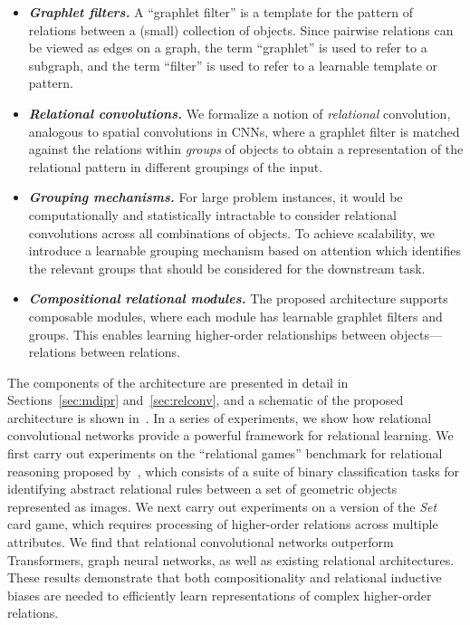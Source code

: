 \begin{itemize}%
    \item \textit{\bfseries Graphlet filters.} A ``graphlet filter'' is a template for the pattern of relations between a (small) collection of objects. 
    Since pairwise relations can be viewed as edges on a graph, the term ``graphlet'' is used to refer to a subgraph, and the term ``filter'' is used to refer to a learnable template or pattern.
    \item \textit{\bfseries Relational convolutions.} 
    We formalize a notion of \textit{relational} convolution, analogous to spatial convolutions in CNNs, where a graphlet filter is matched against the relations within \textit{groups} of objects to obtain a representation of the relational pattern in different groupings of the input.
    \item \textit{\bfseries Grouping mechanisms.} For large problem instances, it would be computationally and statistically intractable to consider relational convolutions across all combinations of objects. To achieve scalability, we introduce a learnable grouping mechanism based on attention which identifies the relevant groups that should be considered for the downstream task.
    \item \textit{\bfseries Compositional relational modules.} The proposed architecture supports composable modules, where each module has learnable graphlet filters and groups. This enables learning higher-order relationships between objects---relations between relations.
\end{itemize}


The components of the architecture are presented in detail in Sections~\ref{sec:mdipr} and~\ref{sec:relconv}, and a schematic of the proposed architecture is shown in~. In a series of experiments, we show how relational convolutional networks provide a powerful framework
for relational learning. We first carry out experiments on the ``relational games'' benchmark for relational reasoning proposed by~\citet{shanahanExplicitlyRelationalNeural}, which consists of a suite of binary classification tasks for identifying abstract relational rules between a set of geometric objects represented as images. 
We next carry out experiments on a version of the \textit{Set} card game, which requires processing of higher-order relations across multiple attributes. We find that relational convolutional networks outperform Transformers, graph neural networks, as well as existing relational architectures. These results demonstrate that both compositionality and relational inductive biases are needed to efficiently learn representations of complex higher-order relations.

